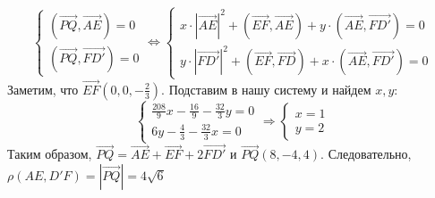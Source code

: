 \documentclass[a4paper, 12pt]{article}
\begin{document}
\begin{spacing}{1}
$$
\begin{cases}
	(\overrightarrow{PQ}, \overrightarrow{AE}) = 0\\
	(\overrightarrow{PQ}, \overrightarrow{FD'}) = 0
\end{cases} \Leftrightarrow
\begin{cases}
	x \cdot |\overrightarrow{AE}|^2 + (\overrightarrow{EF}, \overrightarrow{AE}) + y\cdot (\overrightarrow{AE}, \overrightarrow{FD'}) = 0 \\
	y \cdot |\overrightarrow{FD'}|^2 + (\overrightarrow{EF}, \overrightarrow{FD}) + x\cdot (\overrightarrow{AE}, \overrightarrow{FD'}) = 0 
\end{cases}
$$
Заметим, что $\overrightarrow{EF}(0, 0, -\frac{2}{3})$. Подставим в нашу систему и найдем $x, y$:
$$
\begin{cases}
	\frac{208}{9}x - \frac{16}{9} - \frac{32}{3}y = 0\\
	6y - \frac{4}{3}-\frac{32}{3}x = 0 
\end{cases} \Rightarrow
\begin{cases}
	x = 1\\y = 2
\end{cases}
$$
Таким образом, $\overrightarrow{PQ} = \overrightarrow{AE} + \overrightarrow{EF} + 2\overrightarrow{FD'}$ и $\overrightarrow{PQ}(8, -4, 4)$. Следовательно, $\rho(AE, D'F) = |\overrightarrow{PQ}| = 4\sqrt{6}$













\end{spacing}
\end{document}
